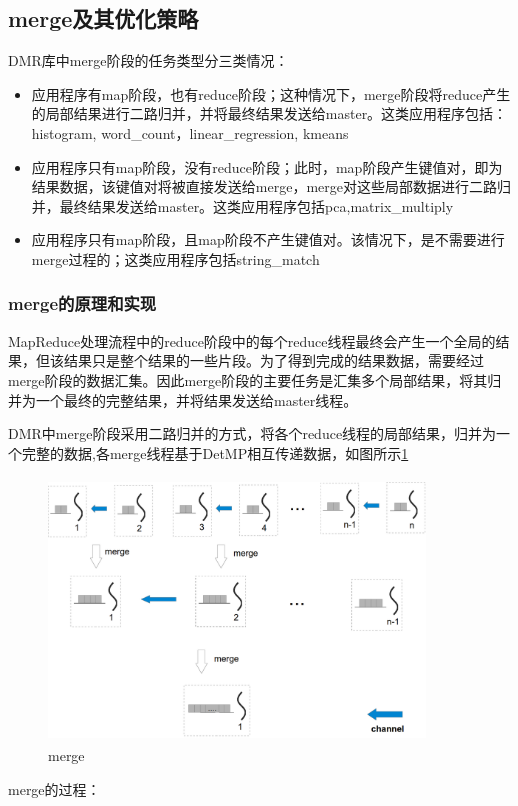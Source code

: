 \subsection{merge及其优化策略}
DMR库中merge阶段的任务类型分三类情况：
\begin{itemize}
  \item 应用程序有map阶段，也有reduce阶段；这种情况下，merge阶段将reduce产生的局部结果进行二路归并，并将最终结果发送给master。这类应用程序包括：histogram, word\_count，linear\_regression, kmeans
  \item 应用程序只有map阶段，没有reduce阶段；此时，map阶段产生键值对，即为结果数据，该键值对将被直接发送给merge，merge对这些局部数据进行二路归并，最终结果发送给master。这类应用程序包括pca,matrix\_multiply
  \item 应用程序只有map阶段，且map阶段不产生键值对。该情况下，是不需要进行merge过程的；这类应用程序包括string\_match
\end{itemize}


\subsubsection{merge的原理和实现}
MapReduce处理流程中的reduce阶段中的每个reduce线程最终会产生一个全局的结果，但该结果只是整个结果的一些片段。为了得到完成的结果数据，需要经过merge阶段的数据汇集。因此merge阶段的主要任务是汇集多个局部结果，将其归并为一个最终的完整结果，并将结果发送给master线程。

DMR中merge阶段采用二路归并的方式，将各个reduce线程的局部结果，归并为一个完整的数据,各merge线程基于DetMP相互传递数据，如图所示\ref{merge}
\begin{figure}[!h]
    \centering
    \includegraphics[height=7cm,width= 10cm]{img/merge.png}
    \caption{merge}
\label{merge}
\end{figure}
merge的过程：

